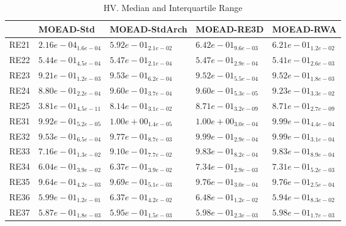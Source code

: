 \documentclass{article}
\begin{document}
\begin{table}
\caption{HV. Median and Interquartile Range}
\label{table: HV}
\centering
\begin{scriptsize}
\begin{tabular}{lllll}
\hline & MOEAD-Std & MOEAD-StdArch & MOEAD-RE3D &  MOEAD-RWA\\
\hline 
RE21 & $  2.16e-04_{ 1.6e-04}$ & $  5.92e-01_{ 2.1e-02}$ & \cellcolor{gray95}$  6.42e-01_{ 9.6e-03}$ & \cellcolor{gray25}$  6.21e-01_{ 1.2e-02}$ \\
RE22 & $  5.44e-01_{ 4.5e-04}$ & \cellcolor{gray95}$  5.47e-01_{ 2.1e-04}$ & \cellcolor{gray25}$  5.47e-01_{ 2.9e-04}$ & $  5.41e-01_{ 2.6e-03}$ \\
RE23 & $  9.21e-01_{ 1.2e-03}$ & \cellcolor{gray95}$  9.53e-01_{ 6.2e-04}$ & $  9.52e-01_{ 5.5e-04}$ & \cellcolor{gray25}$  9.52e-01_{ 1.8e-03}$ \\
RE24 & $  8.80e-01_{ 2.2e-04}$ & \cellcolor{gray25}$  9.60e-01_{ 3.7e-04}$ & \cellcolor{gray95}$  9.60e-01_{ 5.3e-05}$ & $  9.23e-01_{ 3.3e-02}$ \\
RE25 & $  3.81e-01_{ 4.5e-11}$ & $  8.14e-01_{ 3.1e-02}$ & \cellcolor{gray25}$  8.71e-01_{ 3.2e-09}$ & \cellcolor{gray95}$  8.71e-01_{ 2.7e-09}$ \\
RE31 & $  9.92e-01_{ 5.2e-05}$ & \cellcolor{gray95}$  1.00e+00_{ 1.4e-05}$ & \cellcolor{gray25}$  1.00e+00_{ 3.0e-04}$ & $  9.99e-01_{ 4.4e-04}$ \\
RE32 & $  9.53e-01_{ 6.5e-04}$ & $  9.77e-01_{ 8.7e-03}$ & \cellcolor{gray25}$  9.99e-01_{ 2.9e-04}$ & \cellcolor{gray95}$  9.99e-01_{ 3.1e-04}$ \\
RE33 & $  7.16e-01_{ 1.3e-02}$ & $  9.10e-01_{ 7.7e-02}$ & \cellcolor{gray25}$  9.83e-01_{ 8.2e-04}$ & \cellcolor{gray95}$  9.83e-01_{ 8.9e-04}$ \\
RE34 & $  6.04e-01_{ 3.9e-02}$ & $  6.37e-01_{ 3.9e-02}$ & \cellcolor{gray95}$  7.34e-01_{ 2.9e-03}$ & \cellcolor{gray25}$  7.31e-01_{ 5.2e-03}$ \\
RE35 & $  9.64e-01_{ 4.2e-03}$ & $  9.69e-01_{ 5.1e-03}$ & \cellcolor{gray25}$  9.76e-01_{ 3.0e-04}$ & \cellcolor{gray95}$  9.76e-01_{ 2.5e-04}$ \\
RE36 & $  5.99e-01_{ 1.2e-01}$ & \cellcolor{gray25}$  6.37e-01_{ 4.2e-02}$ & \cellcolor{gray95}$  6.48e-01_{ 1.2e-02}$ & $  5.94e-01_{ 8.3e-02}$ \\
RE37 & $  5.87e-01_{ 1.8e-03}$ & $  5.95e-01_{ 1.5e-03}$ & \cellcolor{gray95}$  5.98e-01_{ 2.3e-03}$ & \cellcolor{gray25}$  5.98e-01_{ 1.7e-03}$ \\

\end{tabular}
\end{scriptsize}
\end{table}
\end{document}
